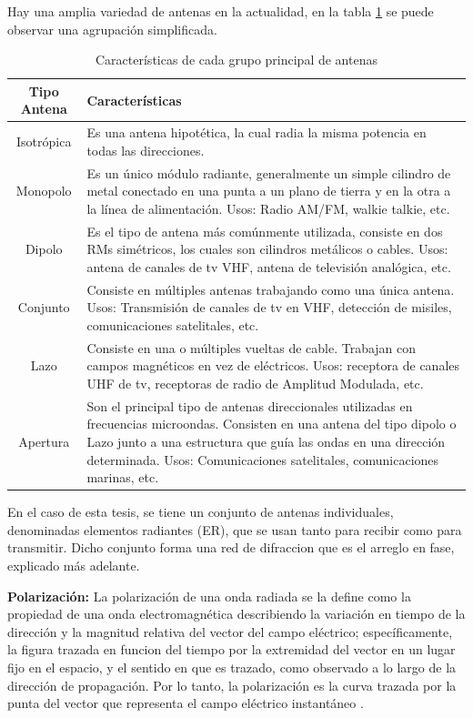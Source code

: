 Hay una amplia variedad de antenas en la actualidad, en la tabla \ref{tab:type_antennas} se puede observar una agrupación 
simplificada.

\begin{table}[H]
  \footnotesize
  \centering
  \begin{tabular}{|c|p{9cm}|}
	\hline
	\textbf{Tipo Antena} & \textbf{Características} \\\hline
	Isotrópica & Es una antena hipotética, la cual radia la misma potencia en todas las direcciones.\\\hline
	Monopolo & Es un único módulo radiante, generalmente un simple cilindro de metal conectado en una punta a un plano de
	tierra y en la otra a la línea de alimentación. Usos: Radio AM/FM, walkie talkie, etc. \\\hline
	Dipolo & Es el tipo de antena más comúnmente utilizada, consiste en dos RMs simétricos, los cuales son cilindros
	metálicos o cables. Usos: antena de canales de tv VHF, antena de televisión analógica, etc. \\\hline
	Conjunto & Consiste en múltiples antenas trabajando como una única antena. Usos: Transmisión de canales de tv en VHF,
	detección de misiles, comunicaciones satelitales, etc.\\\hline
	Lazo & Consiste en una o múltiples vueltas de cable. Trabajan con campos magnéticos en vez de eléctricos. Usos: receptora
	de canales UHF de tv, receptoras de radio de Amplitud Modulada, etc.\\\hline
	Apertura & Son el principal tipo de antenas direccionales utilizadas en frecuencias microondas. Consisten en una antena
	del tipo dipolo o Lazo junto a una estructura que guía las ondas en una dirección determinada. Usos: Comunicaciones
	satelitales, comunicaciones marinas, etc.\\\hline
  \end{tabular}
  \caption{Características de cada grupo principal de antenas}
  \label{tab:type_antennas}
\end{table}


En el caso de esta tesis, se tiene un conjunto de antenas individuales, denominadas elementos radiantes (ER), que se usan tanto
para recibir como para transmitir. Dicho conjunto forma una red de difraccion que es el arreglo en fase, explicado más adelante.

{\textbf{Polarización:}} La polarización de una onda radiada se la define como la propiedad de una onda electromagnética 
describiendo la variación en tiempo de la dirección y la magnitud relativa del vector del campo eléctrico; específicamente, 
la figura trazada en funcion del tiempo por la extremidad del vector en un lugar fijo en el espacio, y el sentido en que es
trazado, como observado a lo largo de la dirección de propagación. Por lo tanto, la polarización es la curva trazada por la
punta del vector que representa el campo eléctrico instantáneo \cite{Balanis2012}. 

